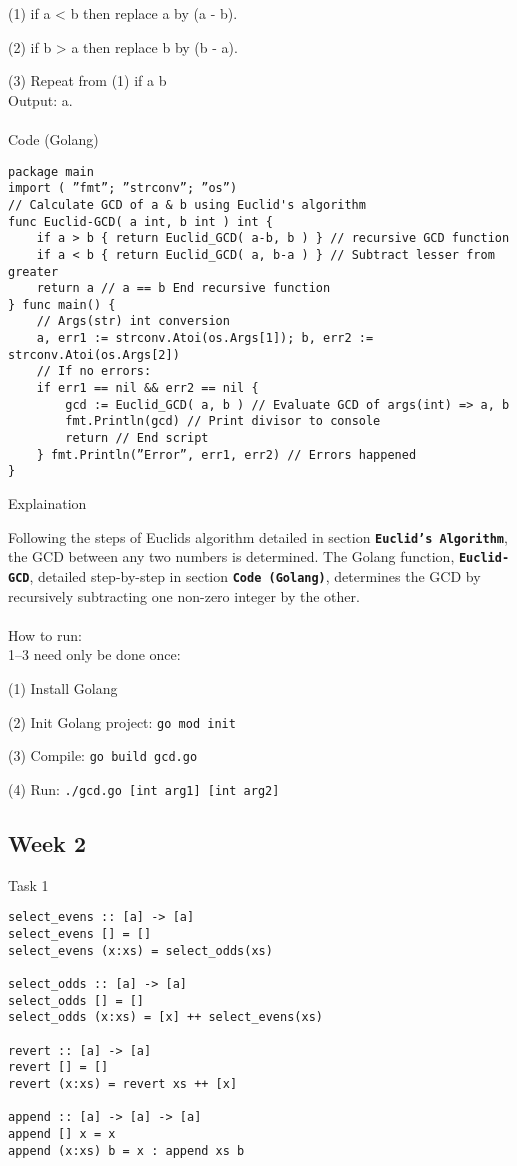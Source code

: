 \documentclass{article}
\theoremstyle{theorem}
\theoremstyle{definition}
\theoremstyle{remark}
\begin{document}
(1) if a {\textless} b then replace a by (a - b). 

(2) if b {\textgreater} a then replace b by (b - a).

(3) Repeat from (1) if a {\neq} b \\ 

Output: a.\\\\

{\large Code (Golang)}
\begin{lstlisting}
package main
import ( ”fmt”; ”strconv”; ”os”)
// Calculate GCD of a & b using Euclid's algorithm
func Euclid-GCD( a int, b int ) int {
    if a > b { return Euclid_GCD( a-b, b ) } // recursive GCD function
    if a < b { return Euclid_GCD( a, b-a ) } // Subtract lesser from greater
	return a // a == b End recursive function
} func main() {
    // Args(str) int conversion 
	a, err1 := strconv.Atoi(os.Args[1]); b, err2 := strconv.Atoi(os.Args[2])
    // If no errors:
	if err1 == nil && err2 == nil {
		gcd := Euclid_GCD( a, b ) // Evaluate GCD of args(int) => a, b
		fmt.Println(gcd) // Print divisor to console
		return // End script
    } fmt.Println(”Error”, err1, err2) // Errors happened
}
\end{lstlisting}

{\large Explaination\\}

Following the steps of Euclids algorithm detailed in section \texttt{{\bf Euclid's Algorithm}}, the GCD between any two numbers is determined. The Golang function, \texttt{{\bf Euclid-GCD}}, detailed step-by-step in section \texttt{{\bf Code (Golang)}}, determines the GCD by recursively subtracting one non-zero integer by the other.\\\\

{\large How to run:\\}
1--3 need only be done once:

(1) Install Golang

(2) Init Golang project: \texttt{go mod init} 

(3) Compile: \texttt{go build gcd.go} 

(4) Run: \texttt{./gcd.go [int arg1] [int arg2]} 

\subsection{Week 2}
{\large Task 1\\}
\begin{lstlisting}
select_evens :: [a] -> [a]
select_evens [] = []
select_evens (x:xs) = select_odds(xs)

select_odds :: [a] -> [a]
select_odds [] = []
select_odds (x:xs) = [x] ++ select_evens(xs)

revert :: [a] -> [a]  
revert [] = []  
revert (x:xs) = revert xs ++ [x]  

append :: [a] -> [a] -> [a]
append [] x = x
append (x:xs) b = x : append xs b
\end{lstlisting}
\end{document}
